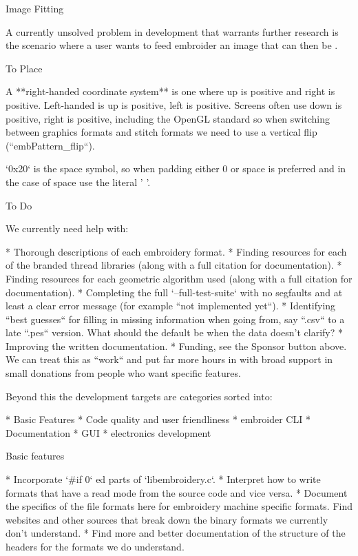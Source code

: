 \documentclass[a4paper]{report}
\begin{document}
{{{{{Image Fitting
~~~~~~~~~~~~~

A currently unsolved problem in development that warrants further research is
the scenario where a user wants to feed embroider an image that can then be .

To Place
~~~~~~~~

A **right-handed coordinate system** 
is one where up is positive and right is
positive. Left-handed is up is positive, left is positive. Screens often use
down is positive, right is positive, including the OpenGL standard so when
switching between graphics formats and stitch formats we need to use a vertical
flip (``embPattern_flip``).

`0x20` is the space symbol, so when padding either 0 or space is preferred and
in the case of space use the literal ' '.

To Do
~~~~~

We currently need help with:

* Thorough descriptions of each embroidery format.
* Finding resources for each of the branded thread libraries (along with a
  full citation for documentation).
* Finding resources for each geometric algorithm used (along with a full
  citation for documentation).
* Completing the full `--full-test-suite` with no segfaults and at least a
  clear error message (for example ``not implemented yet``).
* Identifying ``best guesses`` for filling in missing information when going
  from, say ``.csv`` to a late ``.pes`` version. What should the default be when
  the data doesn't clarify?
* Improving the written documentation.
* Funding, see the Sponsor button above. We can treat this as ``work`` and
  put far more hours in with broad support in small donations from people who want
  specific features.

Beyond this the development targets are categories sorted into:

* Basic Features
* Code quality and user friendliness
* embroider CLI
* Documentation
* GUI
* electronics development

Basic features
~~~~~~~~~~~~~~

* Incorporate `\#if 0` ed parts of `libembroidery.c`.
* Interpret how to write formats that have a read mode from the source
  code and vice versa.
* Document the specifics of the file formats here for embroidery machine
  specific formats. Find websites and other sources that break down the binary
  formats we currently don't understand.
* Find more and better documentation of the structure of the headers for the
  formats we do understand.

}}}}}
\end{document}
